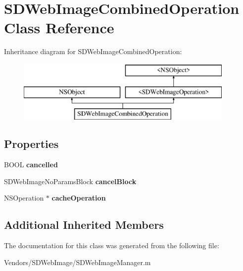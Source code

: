 \hypertarget{interface_s_d_web_image_combined_operation}{}\section{S\+D\+Web\+Image\+Combined\+Operation Class Reference}
\label{interface_s_d_web_image_combined_operation}
Inheritance diagram for S\+D\+Web\+Image\+Combined\+Operation\+:\begin{figure}[H]
\begin{center}
\leavevmode
\includegraphics[height=3.000000cm]{interface_s_d_web_image_combined_operation}
\end{center}
\end{figure}
\subsection*{Properties}
\begin{DoxyCompactItemize}
\item 
\hypertarget{interface_s_d_web_image_combined_operation_acf3810fedf06f6a8887e0e07bff9bc1c}{}B\+O\+O\+L {\bfseries cancelled}\label{interface_s_d_web_image_combined_operation_acf3810fedf06f6a8887e0e07bff9bc1c}

\item 
\hypertarget{interface_s_d_web_image_combined_operation_a7ed450983562183c3cfbdb628ce9751d}{}S\+D\+Web\+Image\+No\+Params\+Block {\bfseries cancel\+Block}\label{interface_s_d_web_image_combined_operation_a7ed450983562183c3cfbdb628ce9751d}

\item 
\hypertarget{interface_s_d_web_image_combined_operation_ae392a0380e8d6f3a3df6503c6b40a49c}{}N\+S\+Operation $\ast$ {\bfseries cache\+Operation}\label{interface_s_d_web_image_combined_operation_ae392a0380e8d6f3a3df6503c6b40a49c}

\end{DoxyCompactItemize}
\subsection*{Additional Inherited Members}


The documentation for this class was generated from the following file\+:\begin{DoxyCompactItemize}
\item 
Vendors/\+S\+D\+Web\+Image/S\+D\+Web\+Image\+Manager.\+m\end{DoxyCompactItemize}
